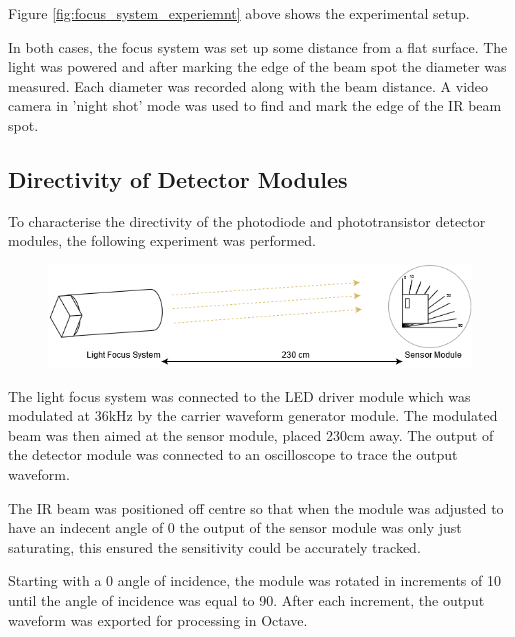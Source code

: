 Figure \ref{fig:focus_system_experiemnt} above shows the experimental setup.

In both cases, the focus system was set up some distance from a flat surface. The light was powered and after marking the edge of the beam spot the diameter was measured. Each diameter was recorded along with the beam distance. A video camera in 'night shot' mode was used to find and mark the edge of the IR beam spot.





\subsection{Directivity of Detector Modules}

To characterise the directivity of the photodiode and phototransistor detector modules, the following experiment was performed.

\begin{figure}[H]
	\centering
	\includegraphics[width=.9\linewidth]{figures/experimentation/beam_angle_of_receiver.png}
	\label{fig:directivity_experiement_setup}
\end{figure}

The light focus system was connected to the LED driver module which was modulated at 36kHz by the carrier waveform generator module. The modulated beam was then aimed at the sensor module, placed 230cm away. The output of the detector module was connected to an oscilloscope to trace the output waveform.

The IR beam was positioned off centre so that when the module was adjusted to have an indecent angle of 0\textdegree{} the output of the sensor module was only just saturating, this ensured the sensitivity could be accurately tracked.

Starting with a 0\textdegree{} angle of incidence, the module was rotated in increments of 10\textdegree{} until the angle of incidence was equal to 90\textdegree. After each increment, the output waveform was exported for processing in Octave.

